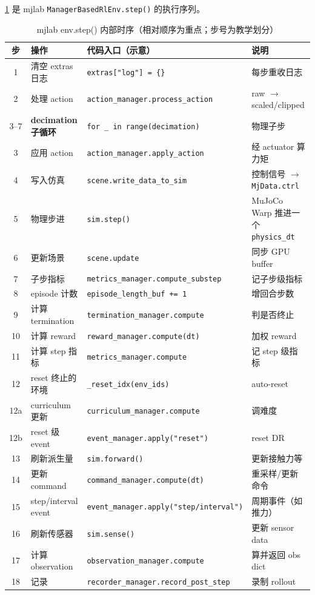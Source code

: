 \cref{tab:rlmc-mgr-step18} 是 mjlab \verb|ManagerBasedRlEnv.step()| 的执行序列。

\begin{table}[ht]
\centering
\caption{mjlab env.step() 内部时序（相对顺序为重点；步号为教学划分）}
\label{tab:rlmc-mgr-step18}
\footnotesize
\begin{tabular}{@{}clll@{}}
\toprule
步 & 操作 & 代码入口（示意） & 说明 \\
\midrule
1 & 清空 extras 日志 & \verb|extras["log"] = {}| & 每步重收日志 \\
2 & 处理 action & \verb|action_manager.process_action| & raw $\to$ scaled/clipped \\
3--7 & \textbf{decimation 子循环} & \verb|for _ in range(decimation)| & 物理子步 \\
3 & \quad 应用 action & \verb|action_manager.apply_action| & 经 actuator 算力矩 \\
4 & \quad 写入仿真 & \verb|scene.write_data_to_sim| & 控制信号 $\to$ \verb|MjData.ctrl| \\
5 & \quad 物理步进 & \verb|sim.step()| & MuJoCo Warp 推进一个 \verb|physics_dt| \\
6 & \quad 更新场景 & \verb|scene.update| & 同步 GPU buffer \\
7 & \quad 子步指标 & \verb|metrics_manager.compute_substep| & 记子步级指标 \\
8 & episode 计数 & \verb|episode_length_buf += 1| & 增回合步数 \\
9 & 计算 termination & \verb|termination_manager.compute| & 判是否终止 \\
10 & 计算 reward & \verb|reward_manager.compute(dt)| & 加权 reward \\
11 & 计算 step 指标 & \verb|metrics_manager.compute| & 记 step 级指标 \\
12 & reset 终止的环境 & \verb|_reset_idx(env_ids)| & auto-reset \\
12a & \quad curriculum 更新 & \verb|curriculum_manager.compute| & 调难度 \\
12b & \quad reset 级 event & \verb|event_manager.apply("reset")| & reset DR \\
13 & 刷新派生量 & \verb|sim.forward()| & 更新接触力等 \\
14 & 更新 command & \verb|command_manager.compute(dt)| & 重采样/更新命令 \\
15 & step/interval event & \verb|event_manager.apply("step/interval")| & 周期事件（如推力） \\
16 & 刷新传感器 & \verb|sim.sense()| & 更新 sensor data \\
17 & 计算 observation & \verb|observation_manager.compute| & 算并返回 obs dict \\
18 & 记录 & \verb|recorder_manager.record_post_step| & 录制 rollout \\
\bottomrule
\end{tabular}
\end{table}

